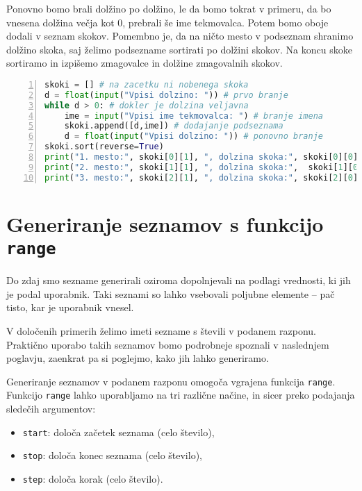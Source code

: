 \begin{resitev}
Ponovno bomo brali dolžino po dolžino, le da bomo tokrat v primeru, da bo vnesena dolžina večja kot 0, prebrali še ime tekmovalca. Potem bomo oboje dodali v seznam skokov. Pomembno je, da na ničto mesto v podseznam shranimo dolžino skoka, saj želimo podsezname sortirati po dolžini skokov. Na koncu skoke sortiramo in izpišemo zmagovalce in dolžine zmagovalnih skokov.
\begin{lstlisting}[language=Python, showstringspaces=false,numbers=left]
skoki = [] # na zacetku ni nobenega skoka
d = float(input("Vpisi dolzino: ")) # prvo branje
while d > 0: # dokler je dolzina veljavna
    ime = input("Vpisi ime tekmovalca: ") # branje imena
    skoki.append([d,ime]) # dodajanje podseznama
    d = float(input("Vpisi dolzino: ")) # ponovno branje
skoki.sort(reverse=True)
print("1. mesto:", skoki[0][1], ", dolzina skoka:", skoki[0][0])
print("2. mesto:", skoki[1][1], ", dolzina skoka:",  skoki[1][0])
print("3. mesto:", skoki[2][1], ", dolzina skoka:", skoki[2][0])
\end{lstlisting}
\end{resitev}

\section{Generiranje seznamov s funkcijo \texttt{range}}

Do zdaj smo sezname generirali oziroma dopolnjevali na podlagi vrednosti, ki jih je podal uporabnik. Taki seznami so lahko vsebovali poljubne elemente -- pač tisto, kar je uporabnik vnesel.

V določenih primerih želimo imeti sezname s števili v podanem razponu. Praktično uporabo takih seznamov bomo podrobneje spoznali v naslednjem poglavju, zaenkrat pa si poglejmo, kako jih lahko generiramo.

Generiranje seznamov v podanem razponu omogoča vgrajena funkcija \texttt{range}. Funkcijo \texttt{range} lahko uporabljamo na tri različne načine, in sicer preko podajanja sledečih argumentov:
\begin{itemize}
\item \texttt{start}: določa začetek seznama (celo število),
\item \texttt{stop}: določa konec seznama (celo število),
\item \texttt{step}: določa korak (celo število).
\end{itemize}

